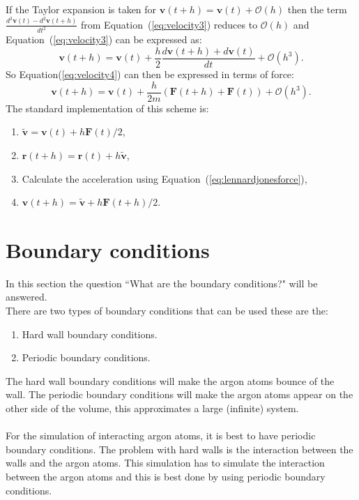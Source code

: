 \documentclass[12pt,a4paper]{report}
\begin{document}
If the Taylor expansion is taken for $\boldsymbol{v}(t+h)=\boldsymbol{v}(t)+\mathcal{O}(h)$ then the term $\frac{d^2\boldsymbol{v}(t)-d^2\boldsymbol{v}(t+h)}{dt^2}$ from Equation~(\ref{eq:velocity3}) reduces to $\mathcal{O}(h)$ and Equation~(\ref{eq:velocity3}) can be expressed as:
\begin{equation}\label{eq:velocity4}
\boldsymbol{v}(t+h)= \boldsymbol{v}(t) + \frac{h}{2}\frac{d\boldsymbol{v}(t+h)+d\boldsymbol{v}(t)}{dt} +\mathcal{O}(h^3)\text{.}
\end{equation}
So Equation(\ref{eq:velocity4}) can then be expressed in terms of force:
\begin{equation}\label{eq:velocityverlet}
\boldsymbol{v}(t+h)= \boldsymbol{v}(t) + \frac{h}{2m}(\boldsymbol{F}(t+h)+\boldsymbol{F}(t)) +\mathcal{O}(h^3)\text{.}
\end{equation}
The standard implementation of this scheme is:
\begin{enumerate}
 \item $\tilde{\boldsymbol{v}} = \boldsymbol{v}(t) + h\boldsymbol{F}(t)/2$,
 \item $\boldsymbol{r}(t+h)=\boldsymbol{r}(t)+h\tilde{\boldsymbol{v}}$,
 \item Calculate the acceleration using Equation~(\ref{eq:lennardjonesforce}),
 \item $\boldsymbol{v}(t+h)=\tilde{\boldsymbol{v}}+h\boldsymbol{F}(t+h)/2$.
\end{enumerate}
\section{Boundary conditions}
In this section the question ``What are the boundary conditions?" will be answered.\\
There are two types of boundary conditions that can be used these are the:
\begin{enumerate}
 \item Hard wall boundary conditions.
 \item Periodic boundary conditions.
\end{enumerate}
The hard wall boundary conditions will make the argon atoms bounce of the wall. The periodic boundary conditions will make the argon atoms appear on the other side of the volume, this approximates a large (infinite) system.\\ \\
For the simulation of interacting argon atoms, it is best to have periodic boundary conditions. The problem with hard walls is the interaction between the walls and the argon atoms. This simulation has to simulate the interaction between the argon atoms and this is best done by using periodic boundary conditions. 
\end{document}
